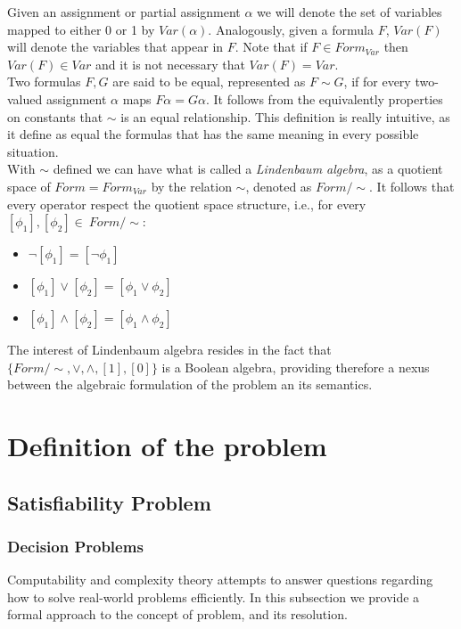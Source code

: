 Given an assignment or partial assignment $\alpha$ we will denote the set of variables mapped to either 0 or 1 by $Var(\alpha)$. Analogously, given a formula $F$, $Var(F)$ will denote the variables that appear in $F$. Note that if $F\in Form_{Var}$ then $Var(F)\in Var$ and it is not necessary that $Var(F)=Var$.\\


Two formulas $F,G$ are said to be equal, represented as $F\sim G$, if for every two-valued assignment $\alpha$ maps $F\alpha = G\alpha$. It follows from the equivalently properties on constants that $\sim$ is an equal relationship. This definition is really intuitive, as it define as equal the formulas that has the same meaning in every possible situation. \\



\label{def:linden}
With $\sim$ defined we can have what is called a \emph{Lindenbaum algebra}, as a quotient space of $Form = Form_{Var}$ by the relation $\sim$, denoted as $Form/\sim$. It follows that every operator respect the quotient space structure, i.e., for every $[\phi_1],[\phi_2]\in\ Form/\sim$:

\begin{itemize}
\item $\neg [\phi_1] = [\neg\phi_1]$
\item $ [\phi_1] \vee [\phi_2]= [\phi_1 \vee \phi_2]$
\item $ [\phi_1] \wedge [\phi_2]= [\phi_1 \wedge \phi_2]$
\end{itemize}

The interest of Lindenbaum algebra resides in the fact that $\{Form/\sim, \vee,\wedge,[1],[0]\}$ is a Boolean algebra, providing therefore a nexus between the algebraic formulation of the problem an its semantics.












\chapter{Definition of the problem}
\section{Satisfiability Problem}
\subsection{Decision Problems}
Computability and complexity theory attempts to answer questions regarding how to solve real-world problems efficiently. In this subsection we provide a formal approach to the concept of problem, and its resolution.\\

